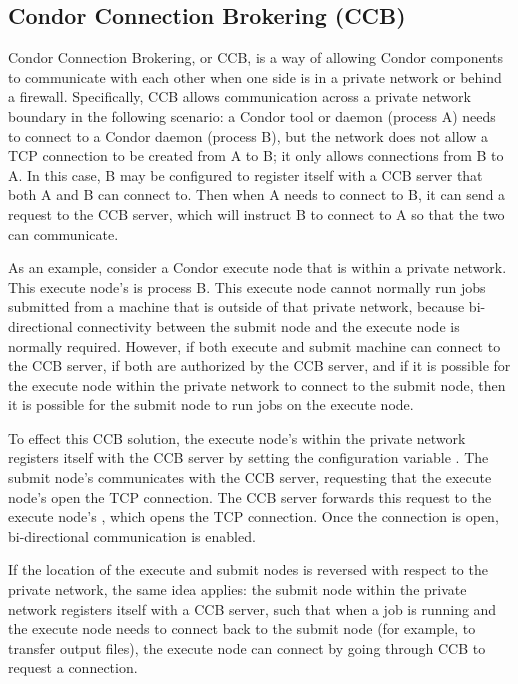\subsection{\label{sec:CCB}Condor Connection Brokering (CCB)}

Condor Connection Brokering, or CCB, is a way of allowing Condor
components to communicate with each other when one side is in a
private network or behind a firewall.  Specifically, CCB allows
communication across a private network boundary in the following
scenario: a Condor tool or daemon (process A) needs to connect to a
Condor daemon (process B), but the network does not allow a TCP
connection to be created from A to B; it only allows connections from
B to A.  In this case, B may be configured
to register itself with a CCB server that both A and B can connect to.
Then when A needs to connect to B, it can send a request to the CCB
server, which will instruct B to connect to A so that the two can
communicate.

As an example, consider a Condor execute node that is within
a private network. 
This execute node's  is process B.
This execute node cannot normally run jobs submitted from a machine
that is outside of that private network, 
because bi-directional connectivity between the submit node and the
execute node is normally required.  
However, 
if both execute and submit machine can connect to the CCB server,
if both are authorized by the CCB server,
and if it is possible for the execute node within the private network
to connect to the submit node,
then it is possible for the submit node to run jobs on the
execute node.

To effect this CCB solution,
the execute node's  within the private network
registers itself with the CCB
server by setting the configuration variable .
The submit node's  communicates with the CCB server,
requesting that the execute node's  open the TCP
connection.
The CCB server forwards this request to the execute node's ,
which opens the TCP connection.
Once the connection is open, bi-directional communication is enabled.

If the location of the execute and submit nodes is reversed 
with respect to the private network,
the same idea applies:
the submit node within the private network registers itself with a CCB server,
such that when a job is running and the execute node needs to connect back to
the submit node (for example, to transfer output files), 
the execute node can connect by going through CCB to request a connection.

